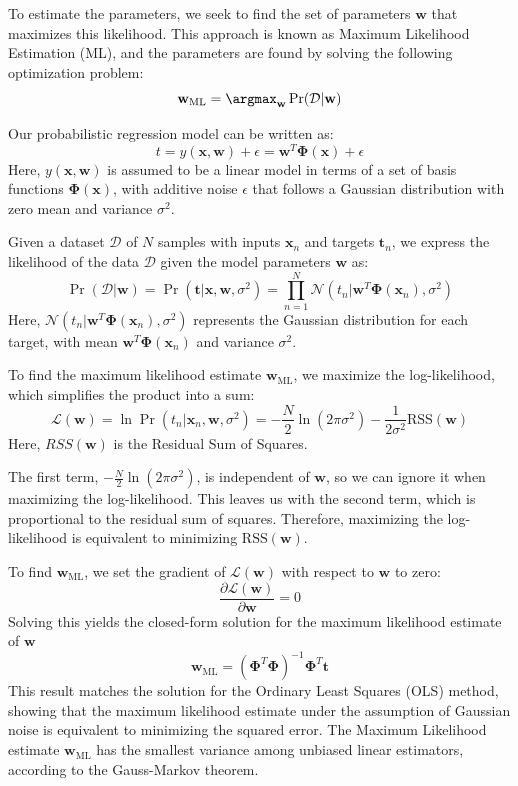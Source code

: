 To estimate the parameters, we seek to find the set of parameters $\mathbf{w}$ that maximizes this likelihood.
This approach is known as Maximum Likelihood Estimation (ML), and the parameters are found by solving the following optimization problem:
\[\mathbf{w}_{\text{ML}}=\argmax_{\mathbf{w}}\Pr(\mathcal{D}|\mathbf{w})\]

Our probabilistic regression model can be written as:
\[t=y(\mathbf{x},\mathbf{w})+\epsilon=\mathbf{w}^T\boldsymbol{\Phi}(\mathbf{x})+\epsilon\]
Here, $y(\mathbf{x},\mathbf{w})$ is assumed to be a linear model in terms of a set of basis functions $\boldsymbol{\Phi}(\mathbf{x})$, with additive noise $\epsilon$ that follows a Gaussian distribution with zero mean and variance $\sigma^2$. 

Given a dataset $\mathcal{D}$ of $N$ samples with inputs $\mathbf{x}_n$ and targets $\mathbf{t}_n$, we express the likelihood of the data $\mathcal{D}$ given the model parameters $\mathbf{w}$ as: 
\[\Pr(\mathcal{D}|\mathbf{w})=\Pr(\mathbf{t}|\mathbf{x},\mathbf{w},\sigma^2)=\prod_{n=1}^{N}\mathcal{N}(t_n|\mathbf{w}^T\boldsymbol{\Phi}(\mathbf{x}_n),\sigma^2)\]
Here, $\mathcal{N}(t_n|\mathbf{w}^T\boldsymbol{\Phi}(\mathbf{x}_n),\sigma^2)$ represents the Gaussian distribution for each target, with mean $\mathbf{w}^T\boldsymbol{\Phi}(\mathbf{x}_n)$ and variance $\sigma^2$. 

To find the maximum likelihood estimate $\mathbf{w}_{\text{ML}}$, we maximize the log-likelihood, which simplifies the product into a sum:
\[\mathcal{L}(\mathbf{w})=\ln\Pr(t_n|\mathbf{x}_n, \mathbf{w} ,\sigma^2)=-\dfrac{N}{2}\ln(2\pi\sigma^2)-\dfrac{1}{2\sigma^2}\text{RSS}(\mathbf{w})\]
Here, $RSS(\mathbf{w})$ is the Residual Sum of Squares.

The first term, $-\frac{N}{2}\ln(2\pi\sigma^2)$, is independent of $\mathbf{w}$, so we can ignore it when maximizing the log-likelihood.
This leaves us with the second term, which is proportional to the residual sum of squares. 
Therefore, maximizing the log-likelihood is equivalent to minimizing $\text{RSS}(\mathbf{w})$. 

To find $\mathbf{w}_{\text{ML}}$, we set the gradient of $\mathcal{L}(\mathbf{w})$ with respect to $\mathbf{w}$ to zero: 
\[\dfrac{\partial \mathcal{L}(\mathbf{w})}{\partial\mathbf{w}}=0\]
Solving this yields the closed-form solution for the maximum likelihood estimate of $\mathbf{w}$
\[\mathbf{w}_{\text{ML}}={\left( \boldsymbol{\Phi}^T\boldsymbol{\Phi} \right)}^{-1}\boldsymbol{\Phi}^T\mathbf{t}\]
This result matches the solution for the Ordinary Least Squares (OLS) method, showing that the maximum likelihood estimate under the assumption of Gaussian noise is equivalent to minimizing the squared error.
The Maximum Likelihood estimate $\mathbf{w}_{\text{ML}}$ has the smallest variance among unbiased linear estimators, according to the Gauss-Markov theorem.

